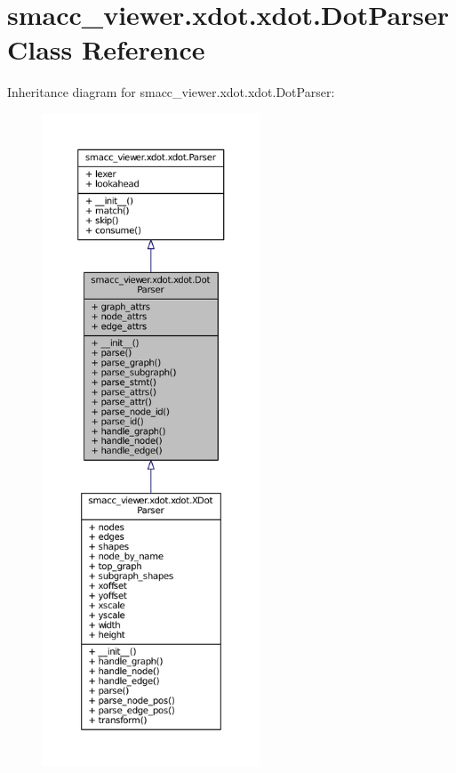 \hypertarget{classsmacc__viewer_1_1xdot_1_1xdot_1_1DotParser}{}\section{smacc\+\_\+viewer.\+xdot.\+xdot.\+Dot\+Parser Class Reference}
\label{classsmacc__viewer_1_1xdot_1_1xdot_1_1DotParser}


Inheritance diagram for smacc\+\_\+viewer.\+xdot.\+xdot.\+Dot\+Parser\+:
\nopagebreak
\begin{figure}[H]
\begin{center}
\leavevmode
\includegraphics[height=550pt]{classsmacc__viewer_1_1xdot_1_1xdot_1_1DotParser__inherit__graph}
\end{center}
\end{figure}


